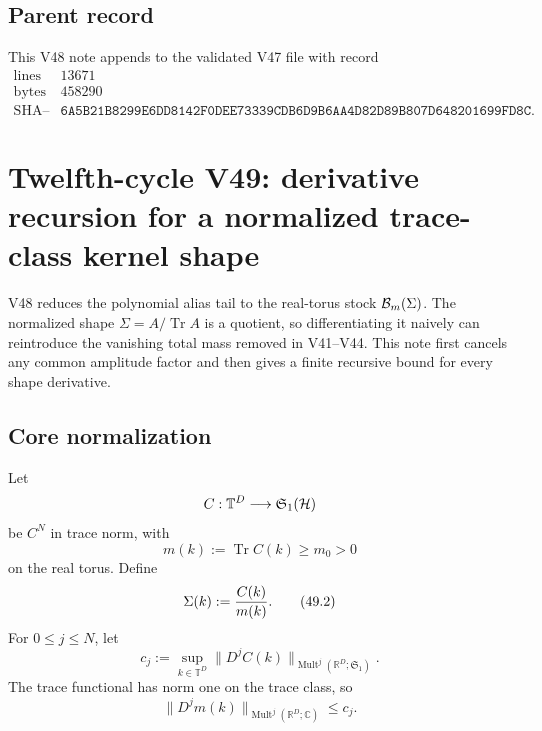 \documentclass[11pt]{article}
\theoremstyle{remark}
\begin{document}
\subsection{Parent record}

This V48 note appends to the validated V47 file with record
\[
\begin{array}{c|c}
\text{lines}&13671\\
\text{bytes}&458290\\
\text{SHA--256}&
\texttt{6A5B21B8299E6DD8142F0DEE73339CDB6D9B6AA4D82D89B807D648201699FD8C}.
\end{array}
\]


\section{Twelfth-cycle V49: derivative recursion for a normalized
trace-class kernel shape}
\label{sec:v12v49}

V48 reduces the polynomial alias tail to the real-torus stock
\({\cal B}_m(\Sigma)\).  The normalized shape
\(\Sigma=A/\operatorname{Tr}A\) is a quotient, so differentiating it
naively can reintroduce the vanishing total mass removed in
V41--V44.  This note first cancels any common amplitude factor and
then gives a finite recursive bound for every shape derivative.

\subsection{Core normalization}

Let
\[
 C:{\mathbb T}^D\longrightarrow{\mathfrak S}_1({\cal H})
\]
be \(C^N\) in trace norm, with
\begin{equation}
 m(k):=\operatorname{Tr}C(k)\geq m_0>0             \tag{49.1}
\end{equation}
on the real torus.  Define
\begin{equation}
                         \Sigma(k):={C(k)\over m(k)}.       \tag{49.2}
\end{equation}
For \(0\leq j\leq N\), let
\begin{equation}
 c_j:=
 \sup_{k\in{\mathbb T}^D}
 \|D^jC(k)\|_{\operatorname{Mult}^j
  (\mathbb R^D;{\mathfrak S}_1)}.                 \tag{49.3}
\end{equation}
The trace functional has norm one on the trace class, so
\begin{equation}
 \|D^jm(k)\|_{\operatorname{Mult}^j(\mathbb R^D;\mathbb C)}
 \leq c_j.                                       \tag{49.4}
\end{equation}
\end{document}
